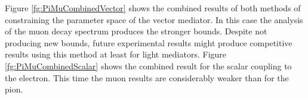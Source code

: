 Figure \ref{fg:PiMuCombinedVector} shows the combined results of both methods of constraining the parameter space of the vector mediator. In this case the analysis of the muon decay spectrum produces the stronger bounds. Despite not producing new bounds, future experimental results might produce competitive results using this method at least for light mediators.
Figure \ref{fg:PiMuCombinedScalar} shows the combined result for the scalar coupling to the electron. This time the muon results are considerably weaker than for the pion. 